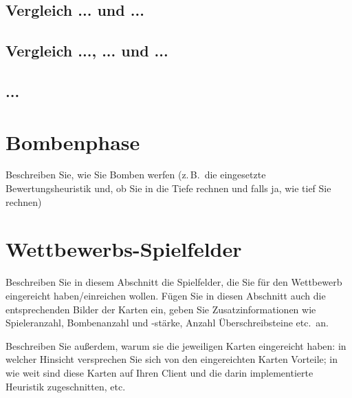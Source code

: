 \documentclass[12pt,a4paper,bibliography=totocnumbered,listof=totocnumbered]{scrartcl}
\begin{document}

    \subsection{Vergleich ... und ...}

    \subsection{Vergleich ..., ... und ...}

    \subsection{...}


    \newpage
    \section{Bombenphase}
    Beschreiben Sie, wie Sie Bomben werfen (z.\,B.\ die eingesetzte Bewertungsheuristik und, ob Sie in die Tiefe rechnen und falls ja, wie tief Sie rechnen)

    \newpage
    \section{Wettbewerbs-Spielfelder}
    Beschreiben Sie in diesem Abschnitt die Spielfelder, die Sie für den Wettbewerb eingereicht haben/einreichen wollen. Fügen Sie in diesen Abschnitt auch die entsprechenden Bilder der Karten ein, geben Sie Zusatzinformationen wie Spieleranzahl, Bombenanzahl und -stärke, Anzahl Überschreibsteine etc.\ an.

    Beschreiben Sie außerdem, warum sie die jeweiligen Karten eingereicht haben: in welcher Hinsicht versprechen Sie sich von den eingereichten Karten Vorteile; in wie weit sind diese Karten auf Ihren Client und die darin implementierte Heuristik zugeschnitten, etc.
	
\end{document}
